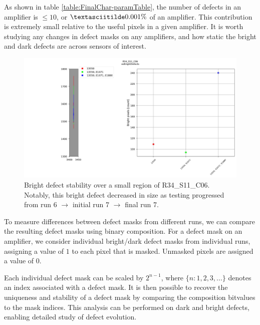 As shown in table \ref{table:FinalChar-paramTable}, the number of defects in an amplifier is $\leq 10$, or $\textasciitilde 0.001 \%$ of an amplifier. This contribution is extremely small relative to the useful pixels in a given amplifier. It is worth studying any changes in defect masks on any amplifiers, and how static the bright and dark defects are across sensors of interest.

\begin{figure}[H]
    \centering
    \includegraphics[width=\linewidth]{figures/R34_S11_C06(1).jpg}
    \caption{Bright defect stability over a small region of R34\_S11\_C06. Notably, this bright defect decreased in size as testing progressed from run 6 $\rightarrow$ initial run 7 $\rightarrow$ final run 7.}
    \label{fig:BrightDefectStability}
\end{figure}

To measure differences between defect masks from different runs, we can compare the resulting defect masks using binary composition. For a defect mask on an amplifier, we consider individual bright/dark defect masks from individual runs, assigning a value of $1$ to each pixel that is masked. Unmasked pixels are assigned a value of $0$.


Each individual defect mask can be scaled by $2^{n-1}$, where $\{n:1,2,3,... \}$ denotes an index associated with a defect mask. It is then possible to recover the uniqueness and stability of a defect mask by comparing the composition bitvalues to the mask indices. This analysis can be performed on dark and bright defects, enabling detailed study of defect evolution. 

